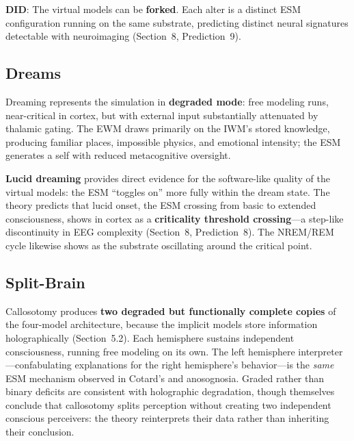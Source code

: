\documentclass[12pt]{article}
\begin{document}
\textbf{DID}: The virtual models can be \textbf{forked}. Each alter is a distinct ESM configuration running on the same substrate, predicting distinct neural signatures detectable with neuroimaging (Section~8, Prediction~9).


\subsection{Dreams}

Dreaming represents the simulation in \textbf{degraded mode}: free modeling runs, near-critical in cortex, but with external input substantially attenuated by thalamic gating. The EWM draws primarily on the IWM's stored knowledge, producing familiar places, impossible physics, and emotional intensity; the ESM generates a self with reduced metacognitive oversight.

\textbf{Lucid dreaming} provides direct evidence for the software-like quality of the virtual models: the ESM ``toggles on'' more fully within the dream state. The theory predicts that lucid onset, the ESM crossing from basic to extended consciousness, shows in cortex as a \textbf{criticality threshold crossing}---\hspace{0pt}a step-like discontinuity in EEG complexity (Section~8, Prediction~8). The NREM/REM cycle likewise shows as the substrate oscillating around the critical point.


\subsection{Split-Brain}

Callosotomy \citep{Gazzaniga1962,Gazzaniga2000} produces \textbf{two degraded but functionally complete copies} of the four-model architecture, because the implicit models store information holographically (Section~5.2). Each hemisphere sustains independent consciousness, running free modeling on its own. The left hemisphere interpreter \citep{Gazzaniga2000}---\hspace{0pt}confabulating explanations for the right hemisphere's behavior---\hspace{0pt}is the \emph{same} ESM mechanism observed in Cotard's and anosognosia. Graded rather than binary deficits \citep{Pinto2017} are consistent with holographic degradation, though \citeauthor{Pinto2017} themselves conclude that callosotomy splits perception without creating two independent conscious perceivers: the theory reinterprets their data rather than inheriting their conclusion.
\end{document}
